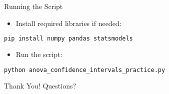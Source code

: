 \documentclass[aspectratio=169]{beamer}
\begin{document}
\begin{frame}[fragile]{Running the Script}
  \begin{itemize}
    \item Install required libraries if needed:
  \end{itemize}
  \begin{lstlisting}[language=bash]
pip install numpy pandas statsmodels
  \end{lstlisting}
  \begin{itemize}
    \item Run the script:
  \end{itemize}
  \begin{lstlisting}[language=bash]
python anova_confidence_intervals_practice.py
  \end{lstlisting}
\end{frame}

\begin{frame}
  \centering
  \Huge Thank You!
  \vspace{1cm}
  \normalsize Questions?
\end{frame}
\end{document}
